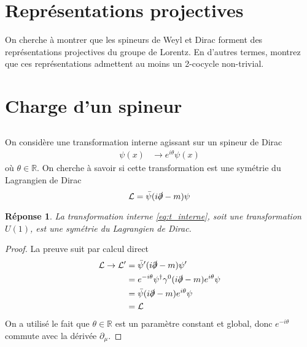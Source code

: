 \documentclass{article}
\numberwithin{equation}{section}
\theoremstyle{solution}
\newtheorem{solution}{Réponse}[section]
\begin{document}
\section{Représentations projectives}
On cherche à montrer que les spineurs de Weyl et Dirac forment des représentations projectives du groupe
de Lorentz. 
En d’autres termes, montrez que ces représentations admettent au moins un 2-cocycle non-trivial.

\section{Charge d’un spineur}
\subsection{}
On considère une transformation interne agissant sur un spineur de Dirac
\begin{equation}\label{eq:t_interne}
	\begin{split}
		\psi(x) &\rightarrow e^{i\theta}\psi(x)
	\end{split}
\end{equation} 
où $\theta \in \mathbb{R}$. On cherche à savoir si cette transformation est une symétrie du Lagrangien de Dirac
\begin{equation}\label{eq:dirac_L}
	\mathcal{L} = \bar{\psi}(i \slashed{\partial} - m)\psi
\end{equation} 

\begin{solution}
La transformation interne \eqref{eq:t_interne}, soit une transformation $U(1)$, est une symétrie du Lagrangien de Dirac.	
\end{solution}
\begin{proof}
La preuve suit par calcul direct
\begin{align*}
        \mathcal{L} \rightarrow \mathcal{L}'  &= \bar{\psi}'  (i \slashed{\partial} - m) \psi' \\
                &= e^{-i\theta} \psi^{\dagger} \gamma^0(i \slashed{\partial} - m) e^{i\theta} \psi \\
                &= \bar{\psi} (i \slashed{\partial} - m) e^{i\theta} \psi \\
                &= \mathcal{L}
\end{align*}	
On a utilisé le fait que $\theta \in \mathbb{R}$ est un paramètre constant et global, donc $e^{-i\theta}$ commute avec 
la dérivée $\partial_\mu$.
\end{proof}
\end{document}
